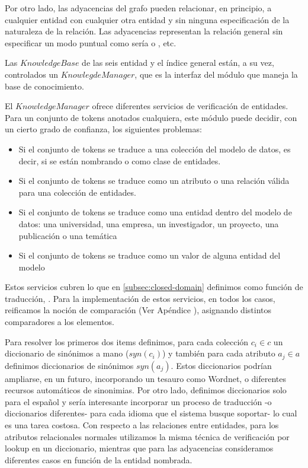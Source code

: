 Por otro lado, las adyacencias del grafo pueden relacionar, en principio, a cualquier entidad con cualquier otra entidad y sin ninguna especificación de la naturaleza de la relación. Las adyacencias representan la relación general  sin especificar un modo puntual como sería  o , etc. 

Las $KnowledgeBase$ de las seis entidad y el índice general están, a su vez, controlados un $KnowlegdeManager$, que es la interfaz del módulo que maneja la base de conocimiento. 

El $KnowledgeManager$ ofrece diferentes servicios de verificación de entidades. Para un conjunto de tokens {\color{red}anotados} cualquiera, este módulo puede decidir, con un cierto grado de confianza, los siguientes problemas:

\begin{itemize}
  \item Si el conjunto de tokens se traduce a una colección del modelo de datos, es decir, si se están nombrando  o  como clase de entidades.
  \item Si el conjunto de tokens se traduce como un atributo o una relación válida para una colección de entidades.
  \item Si el conjunto de tokens se traduce como una entidad dentro del modelo de datos: una universidad, una empresa, un investigador, un proyecto, una publicación o una temática
  \item Si el conjunto de tokens se traduce como un valor de alguna entidad del modelo
\end{itemize}

Estos servicios %
 cubren lo que en \ref{subsec:closed-domain} definimos como función de traducción, \tradqd. Para la implementación de estos servicios, en todos los casos, reificamos la noción de comparación (Ver Apéndice ), asignando distintos comparadores a los elementos. 

Para resolver los primeros dos items definimos, para cada colección $c_i \in c$ un diccionario de sinónimos a mano ($syn(c_i)$) y también para cada atributo $a_j \in a$ definimos diccionarios de sinónimos $syn(a_j)$. Estos diccionarios podrían ampliarse, en un futuro, incorporando un tesauro como Wordnet, o diferentes recursos automáticos de sinonimias. Por otro lado, definimos diccionarios solo para el español y sería interesante incorporar un proceso de traducción -o diccionarios diferentes- para cada idioma que el sistema busque soportar- lo cual es una tarea costosa. Con respecto a las relaciones entre entidades, para los atributos relacionales normales utilizamos la misma técnica de verificación por lookup en un diccionario, mientras que para las adyacencias consideramos diferentes casos en función de la entidad nombrada.

